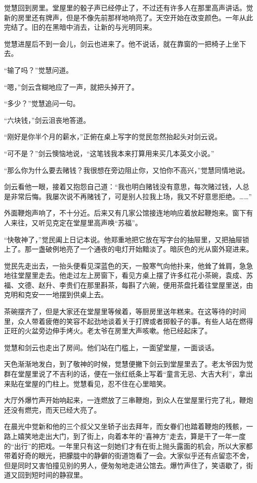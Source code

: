 \par 觉慧回到房里。堂屋里的骰子声已经停止了，不过还有许多人在那里高声讲话。觉新的房里还有牌声，但是不像先前那样地响亮了。天空开始在改变颜色。一年从此完结了。旧的在黑暗中消去，让新的与光明同来。
\par 觉慧进屋后不到一会儿，剑云也进来了。他不说话，就在靠窗的一把椅子上坐下去。
\par “输了吗？”觉慧问道。
\par “嗯，”剑云含糊地应了一声，就把头掉开了。
\par “多少？”觉慧追问一句。
\par “六块钱，”剑云沮丧地答道。
\par “刚好是你半个月的薪水，”正俯在桌上写字的觉民忽然抬起头对剑云说。
\par “可不是？”剑云懊恼地说，“这笔钱我本来打算用来买几本英文小说。”
\par “那么你为什么要去赌钱？我很想在旁边阻止你，又怕你不高兴，”觉慧同情地说。
\par 剑云看他一眼，接着又抱怨自己道：“我也明白赌钱没有意思，每次赌过钱，人总是非常后悔。我屡次说不再赌钱了，可是别人拉我上场，我又不好意思拒绝。……”
\par 外面鞭炮声响了，不十分近。后来又有几家公馆接连地响应着放起鞭炮来。窗下有人来往，又听见克定在堂屋里高声唤“苏福”。
\par “快敬神了，”觉民阖上日记本说。他郑重地把它放在写字台的抽屉里，又把抽屉锁上了。那一盏破例地亮了一个通夜的电灯开始黯淡了。暗灰色的光从窗外窥进来。
\par 觉民先走出去，一抬头便看见深蓝色的天，一股寒气向他扑来，他耸了耸肩，急急地往堂屋里走去。他走过左上房窗下，看见方桌上摆了许多红花小茶碗，袁成、苏福、文德、赵升、李贵们在那里斟茶，每斟了六碗，便用茶盘托着往堂屋里送，由克明和克安一一地摆到供桌上去。
\par 茶碗摆齐了，但是大家还在堂屋里等候着，等厨房里送年糕来。在这等待的时间里，众人带着疲倦的笑容不起劲地谈着关于打牌或者掷骰子的事。有些人站在燃得正旺的火盆旁边伸手烤火。老太爷在房里大声咳嗽。他已经起床了。
\par 觉慧和剑云也走出了房间。他们站在门槛上，一面望堂屋，一面谈话。
\par 天色渐渐地发白，到了敬神的时候，觉慧便撇下剑云到堂屋里去了。老太爷因为觉群在堂屋里说了不吉利的话，便在一张红纸条上写着“童言无忌、大吉大利”，拿出来贴在堂屋的门柱上。觉慧看见，忍不住在心里暗笑。
\par 大厅外爆竹声开始响起来，一连燃放了三串鞭炮，到众人在堂屋里行完了礼，鞭炮还没有燃完，而天已经大亮了。
\par 在晨光中觉新和他的三个叔父又坐轿子出去拜年，而女眷们也踏着鞭炮的残骸，一路上嬉笑地走出大门，到了街上，向着本年的“喜神方”走去，算是干了一年一度的“出行”的把戏。一年里只有这一刻她们才有在街上抛头露面的机会，所以大家都带着好奇的眼光，把朦胧中的静僻的街道饱看了一会。大家似乎还有点留恋不舍，但是同时又害怕撞见别的男人，便匆匆地走进公馆去。爆竹声住了，笑语歇了，街道又回到短时间的静寂里。
